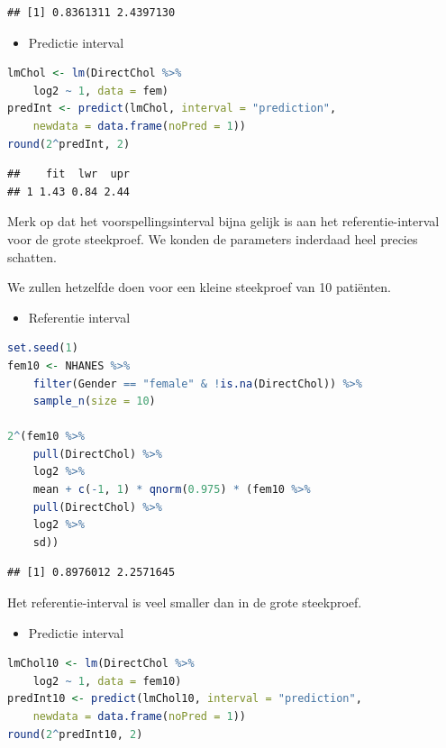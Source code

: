\documentclass[
  12pt,dutch,coursenotes]{book}
\providecommand{\tightlist}{%
  \setlength{\itemsep}{0pt}\setlength{\parskip}{0pt}}
\theoremstyle{definition}
\theoremstyle{definition}
\theoremstyle{definition}
\theoremstyle{definition}
\theoremstyle{remark}
\begin{document}
\begin{lstlisting}
## [1] 0.8361311 2.4397130
\end{lstlisting}

\begin{itemize}
\tightlist
\item
  Predictie interval
\end{itemize}

\begin{lstlisting}[language=R]
lmChol <- lm(DirectChol %>%
    log2 ~ 1, data = fem)
predInt <- predict(lmChol, interval = "prediction",
    newdata = data.frame(noPred = 1))
round(2^predInt, 2)
\end{lstlisting}

\begin{lstlisting}
##    fit  lwr  upr
## 1 1.43 0.84 2.44
\end{lstlisting}

Merk op dat het voorspellingsinterval bijna gelijk is aan het referentie-interval voor de grote steekproef. We konden de parameters inderdaad heel precies schatten.

We zullen hetzelfde doen voor een kleine steekproef van 10 patiënten.

\begin{itemize}
\tightlist
\item
  Referentie interval
\end{itemize}

\begin{lstlisting}[language=R]
set.seed(1)
fem10 <- NHANES %>%
    filter(Gender == "female" & !is.na(DirectChol)) %>%
    sample_n(size = 10)

2^(fem10 %>%
    pull(DirectChol) %>%
    log2 %>%
    mean + c(-1, 1) * qnorm(0.975) * (fem10 %>%
    pull(DirectChol) %>%
    log2 %>%
    sd))
\end{lstlisting}

\begin{lstlisting}
## [1] 0.8976012 2.2571645
\end{lstlisting}

Het referentie-interval is veel smaller dan in de grote steekproef.

\begin{itemize}
\tightlist
\item
  Predictie interval
\end{itemize}

\begin{lstlisting}[language=R]
lmChol10 <- lm(DirectChol %>%
    log2 ~ 1, data = fem10)
predInt10 <- predict(lmChol10, interval = "prediction",
    newdata = data.frame(noPred = 1))
round(2^predInt10, 2)
\end{lstlisting}
\end{document}
